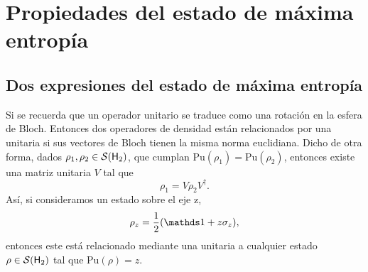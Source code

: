 \section{Propiedades del estado de máxima entropía}

\subsection{Dos expresiones del estado de máxima entropía}


Si se recuerda que un operador unitario se traduce como una rotación en la esfera de Bloch. Entonces dos operadores de densidad están relacionados por una unitaria si sus vectores de Bloch tienen la misma norma euclidiana. Dicho de otra forma, dados $\rho_{1},\rho_{2}\in\mathcal{S}({\sf H}_{2})$, que cumplan $\text{Pu}(\rho_{1})=\text{Pu}(\rho_{2})$, entonces existe una matriz unitaria $V$ tal que
\begin{equation}
    \rho_{1}=V\rho_{2}V^{\dag}.
\end{equation}
Así, si consideramos un estado sobre el eje z,
\begin{equation}\label{eq:rhoz}
\rho_{z}=\frac{1}{2}\qty(\Id+z\sigma_{z}),
\end{equation}
entonces este está relacionado mediante una unitaria a cualquier estado $\rho\in\mathcal{S}({\sf H}_2)$ tal que $\text{Pu}(\rho)=z$.

